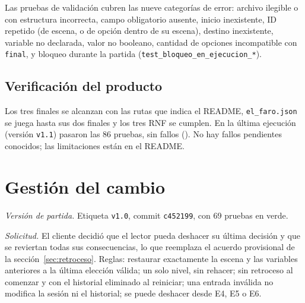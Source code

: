 \documentclass[11pt,letterpaper]{article}
\newcommand{\cod}[1]{\texttt{#1}}
\begin{document}
Las pruebas de validación cubren las nueve categorías de error: archivo ilegible o con estructura incorrecta, campo obligatorio ausente, inicio inexistente, ID repetido (de escena, o de opción dentro de su escena), destino inexistente, variable no declarada, valor no booleano, cantidad de opciones incompatible con \cod{final}, y bloqueo durante la partida (\cod{test\_bloqueo\_en\_ejecucion\_*}).

\subsection{Verificación del producto}
Los tres finales se alcanzan con las rutas que indica el README, \cod{el\_faro.json} se juega hasta sus dos finales y los tres RNF se cumplen. En la última ejecución (versión \cod{v1.1}) pasaron las 86 pruebas, sin fallos (). No hay fallos pendientes conocidos; las limitaciones están en el README.

\section{Gestión del cambio}\label{sec:cambio}
\textit{Versión de partida.} Etiqueta \cod{v1.0}, commit \cod{c452199}, con 69 pruebas en verde.

\textit{Solicitud.} El cliente decidió que el lector pueda deshacer su última decisión y que se reviertan todas sus consecuencias, lo que reemplaza el acuerdo provisional de la sección~\ref{sec:retroceso}. Reglas: restaurar exactamente la escena y las variables anteriores a la última elección válida; un solo nivel, sin rehacer; sin retroceso al comenzar y con el historial eliminado al reiniciar; una entrada inválida no modifica la sesión ni el historial; se puede deshacer desde E4, E5 o E6.
\end{document}
